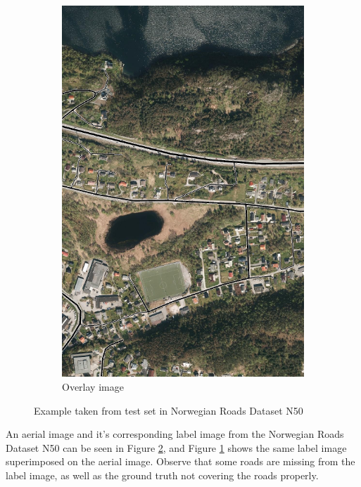 \begin{figure}
\begin{subfigure}{0.32\textwidth}
\includegraphics[width=\linewidth]{figs/datasets/Norwegian_roads_overlay_example2.png}
\caption{Overlay image} \label{fig:norwegian_roads_example_overlay}
\end{subfigure}
\hspace*{\fill} %
\caption{Example taken from test set in Norwegian Roads Dataset N50} \label{fig:norwegian_roads_example}
\end{figure}

An aerial image and it's corresponding label image from the Norwegian Roads Dataset N50 can be seen in Figure \ref{fig:norwegian_roads_example}, and Figure \ref{fig:norwegian_roads_example_overlay} shows the same label image superimposed on the aerial image. Observe that some roads are missing from the label image, as well as the ground truth not covering the roads properly. \\
